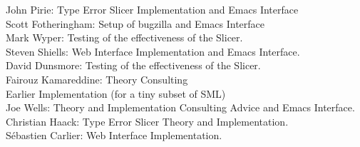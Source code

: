 \documentclass{report}
\begin{document}
	John Pirie: Type Error Slicer Implementation and Emacs Interface\\

        Scott Fotheringham: Setup of bugzilla and Emacs Interface\\

        Mark Wyper: Testing of the effectiveness of the Slicer.\\

	Steven Shiells: Web Interface Implementation and Emacs Interface.\\

	David Dunsmore: Testing of the effectiveness of the Slicer.\\

	Fairouz Kamareddine: Theory Consulting\\

Earlier Implementation (for a tiny subset of SML)\\

	Joe Wells: Theory and Implementation Consulting Advice and Emacs
	    	   Interface.\\

	Christian Haack: Type Error Slicer Theory and Implementation.\\

	Sébastien Carlier: Web Interface Implementation.
\end{document}
